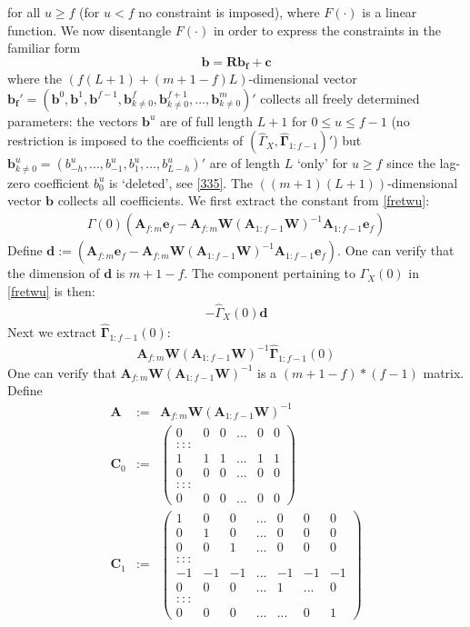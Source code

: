 \documentclass[11pt]{article}
\begin{document}
for all $u\geq f$ (for $u<f$ no constraint is imposed), where $F(\cdot)$ is a linear function. We now disentangle $F(\cdot)$ in order to express the constraints in the familiar form 
\begin{equation}\mathbf{b=Rb_f+c}\label{Rcb}\end{equation}
where the $(f(L+1)+(m+1-f)L)$-dimensional vector $\mathbf{b_f'}=(\mathbf{b}^0,\mathbf{b}^1,\mathbf{b}^{f-1},\mathbf{b}_{k\not=0}^f,\mathbf{b}_{k\not=0}^{f+1},...,\mathbf{b}_{k\not=0}^m)'$ collects all freely determined parameters: the vectors  $\mathbf{b}^u$ are of full length $L+1$ for $0\leq u\leq f-1$ (no restriction is imposed to the coefficients of $\left(\hat{\Gamma}_X,\mathbf{\hat{\Gamma}}_{1:f-1}\right)'$) but $\mathbf{b}_{k\not=0}^u=(b_{-h}^u,...,b_{-1}^u,b_1^u,...,b_{L-h}^u)'$ are of length $L$ `only' for   $ u\geq f$ since the lag-zero coefficient $b_0^u$ is `deleted', see \ref{335}. The $((m+1)(L+1))$-dimensional vector $\mathbf{b}$ collects all coefficients. We first extract the constant from \ref{fretwu}:
\begin{eqnarray*}
\Gamma(0)\left(\mathbf{A}_{f:m}\mathbf{e}_f-\mathbf{A}_{f:m}\mathbf{W}(\mathbf{A}_{1:f-1}\mathbf{W})^{-1}\mathbf{A}_{1:f-1}\mathbf{e}_f\right)
\end{eqnarray*}
Define $\mathbf{d}:=\left(\mathbf{A}_{f:m}\mathbf{e}_f-\mathbf{A}_{f:m}\mathbf{W}(\mathbf{A}_{1:f-1}\mathbf{W})^{-1}\mathbf{A}_{1:f-1}\mathbf{e}_f\right)$.
One can verify that the dimension of $\mathbf{d}$ is $m+1-f$. The component pertaining to $\hat{\Gamma}_X(0)$ in \ref{fretwu} is then:
\begin{eqnarray*}
-\hat{\Gamma}_X(0)\mathbf{d}
\end{eqnarray*}
Next we extract $\mathbf{\hat{\Gamma}}_{1:f-1}(0)$:
\begin{eqnarray*}
\mathbf{A}_{f:m}\mathbf{W}(\mathbf{A}_{1:f-1}\mathbf{W})^{-1}\mathbf{\hat{\Gamma}}_{1:f-1}(0)
\end{eqnarray*}
One can verify that $\mathbf{A}_{f:m}\mathbf{W}(\mathbf{A}_{1:f-1}\mathbf{W})^{-1}$ is a $(m+1-f)*(f-1)$ matrix. Define 
\begin{eqnarray*}
\mathbf{A}&:=&\mathbf{A}_{f:m}\mathbf{W}(\mathbf{A}_{1:f-1}\mathbf{W})^{-1}\\
\mathbf{C}_0&:=&\left(\begin{array}{cccccc}
0&0&0&...&0&0\\
:::\\
1&1&1&...&1&1\\
0&0&0&...&0&0\\
:::\\
0&0&0&...&0&0
\end{array}\right)\\
\mathbf{C}_1&:=&\left(\begin{array}{ccccccc}
1&0&0&...&0&0&0\\
0&1&0&...&0&0&0\\
0&0&1&...&0&0&0\\
:::\\
-1&-1&-1&...&-1&-1&-1\\
0&0&0&...&1&...&0\\
:::\\
0&0&0&...&...&0&1
\end{array}\right)
\end{eqnarray*}
\end{document}

